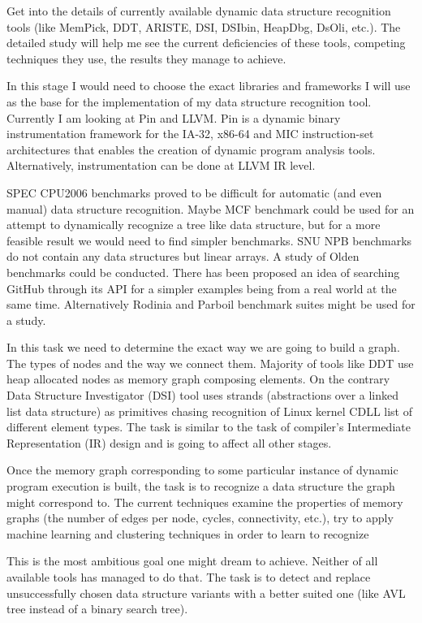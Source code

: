 \documentclass[10pt,a4paper]{report}
\begin{document}
\begin{description}[style=nextline]
\item [Detailed Literature Review] Get into the details of currently available dynamic data structure recognition tools (like MemPick, DDT, ARISTE, DSI, DSIbin, HeapDbg, DsOli, etc.). The detailed study will help me see the current deficiencies of these tools, competing techniques they use, the results they manage to achieve. 

\item [Technical Implementation Planning] In this stage I would need to choose the exact libraries and frameworks I will use as the base for the implementation of my data structure recognition tool. Currently I am looking at Pin and LLVM. Pin is a dynamic binary instrumentation framework for the IA-32, x86-64 and MIC instruction-set architectures that enables the creation of dynamic program analysis tools. Alternatively, instrumentation can be done at LLVM IR level.

\item [The Search of Suitable Benchmarks] SPEC CPU2006 benchmarks proved to be difficult for automatic (and even manual) data structure recognition. Maybe MCF benchmark could be used for an attempt to dynamically recognize a tree like data structure, but for a more feasible result we would need to find simpler benchmarks. SNU NPB benchmarks do not contain any data structures but linear arrays. A study of Olden benchmarks could be conducted. There has been proposed an idea of searching GitHub through its API for a simpler examples being from a real world at the same time. Alternatively Rodinia and Parboil benchmark suites might be used for a study.

\item [Memory Graph Construction] In this task we need to determine the exact way we are going to build a graph. The types of nodes and the way we connect them. Majority of tools like DDT \cite{1669122} use heap allocated nodes as memory graph composing elements. On the contrary Data Structure Investigator (DSI) tool \cite{Rupprecht:2017:DID:3155562.3155607} uses strands (abstractions over a linked list data structure) as primitives chasing recognition of Linux kernel CDLL list of different element types. The task is similar to the task of compiler's Intermediate Representation (IR) design and is going to affect all other stages.

\item [Memory Graph Analysis] Once the memory graph corresponding to some particular instance of dynamic program execution is built, the task is to recognize a data structure the graph might correspond to. The current techniques examine the properties of memory graphs (the number of edges per node, cycles, connectivity, etc.), try to apply machine learning and clustering techniques in order to learn to recognize  
\item [Data Structure Replacement] This is the most ambitious goal one might dream to achieve. Neither of all available tools has managed to do that. The task is to detect and replace unsuccessfully chosen data structure variants with a better suited one (like AVL tree instead of a binary search tree).   

\end{description}

\printbibliography
\end{document}
